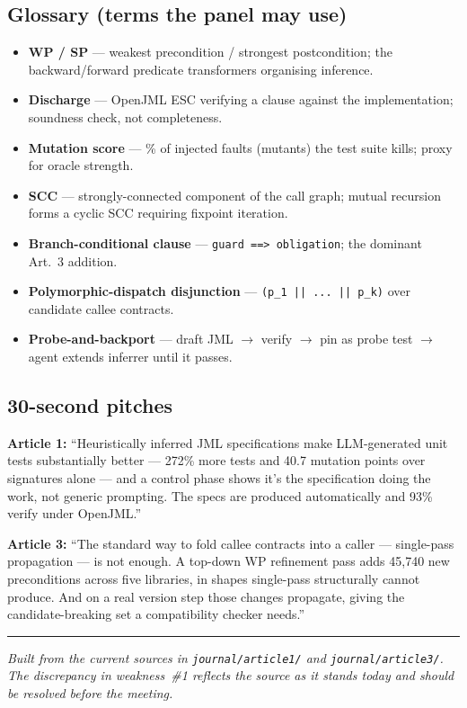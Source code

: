 \documentclass[11pt]{article}
\begin{document}
\subsection{Glossary (terms the panel may use)}
\begin{itemize}[leftmargin=1.4em,itemsep=0.02em]
  \item \textbf{WP / SP} --- weakest precondition / strongest postcondition;
        the backward/forward predicate transformers organising inference.
  \item \textbf{Discharge} --- OpenJML ESC verifying a clause against the
        implementation; soundness check, not completeness.
  \item \textbf{Mutation score} --- \% of injected faults (mutants) the test
        suite kills; proxy for oracle strength.
  \item \textbf{SCC} --- strongly-connected component of the call graph;
        mutual recursion forms a cyclic SCC requiring fixpoint iteration.
  \item \textbf{Branch-conditional clause} --- \texttt{guard ==> obligation};
        the dominant Art.~3 addition.
  \item \textbf{Polymorphic-dispatch disjunction} --- \texttt{(p\_1 || ... ||
        p\_k)} over candidate callee contracts.
  \item \textbf{Probe-and-backport} --- draft JML $\to$ verify $\to$ pin as
        probe test $\to$ agent extends inferrer until it passes.
\end{itemize}

\subsection{30-second pitches}
\textbf{Article 1:} ``Heuristically inferred JML specifications make
LLM-generated unit tests substantially better --- 272\% more tests and 40.7
mutation points over signatures alone --- and a control phase shows it's the
specification doing the work, not generic prompting. The specs are produced
automatically and 93\% verify under OpenJML.''

\textbf{Article 3:} ``The standard way to fold callee contracts into a caller
--- single-pass propagation --- is not enough. A top-down WP refinement pass
adds 45{,}740 new preconditions across five libraries, in shapes single-pass
structurally cannot produce. And on a real version step those changes
propagate, giving the candidate-breaking set a compatibility checker needs.''

\vspace{1em}
\hrule
\vspace{0.5em}
\small\itshape Built from the current sources in \texttt{journal/article1/} and
\texttt{journal/article3/}. The discrepancy in weakness~\#1 reflects the source
as it stands today and should be resolved before the meeting.
\end{document}
